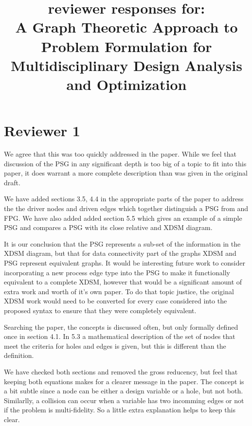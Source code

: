 \documentclass{aiaa-tc}
\title{reviewer responses for: \\ A Graph Theoretic Approach to Problem Formulation for 
Multidisciplinary Design Analysis and Optimization}
\begin{document}
\maketitle

\section{Reviewer 1}


We agree that this was too quickly addressed in the paper. While we feel that 
discussion of the PSG in any significant depth is too big of a topic to fit into 
this paper, it does warrant a more complete description than was given in the 
original draft. 

We have added sections 3.5, 4.4 in the appropriate 
parts of the paper to address the the driver nodes and driven edges which 
together distinguish a PSG from and FPG.  We have also added added section 5.5
which gives an example of a simple PSG and compares a PSG with its close relative
and XDSM diagram. 

It is our conclusion that the PSG represents a sub-set of the information in the XDSM
diagram, but that for data connectivity part of the graphs XDSM and PSG represent 
equivalent graphs. It would be interesting future work to consider incorporating a new
process edge type into the PSG to make it functionally equivalent to a complete XDSM, 
however that would be a significant amount of extra work and worth of it's own paper. 
To do that topic justice, the original XDSM work would need to be converted for every 
case considered into the proposed syntax to ensure that they were completely equivalent.


Searching the paper, the concepts is discussed often, but only formally defined once 
in section 4.1. In 5.3 a mathematical description of the set of nodes that meet
the criteria for holes and edges is given, but this is different than the definition. 

We have checked both sections and removed the gross reducency, but feel that keeping 
both equations makes for a clearer message in the paper. The concept is a bit subtle 
since a node can be either a design variable or a hole, but not both. Similarlly, 
a collision can occur when a variable has two incomming edges or not if the problem 
is multi-fidelity. So a little extra explanation helps to keep this clear. 
\end{document}
